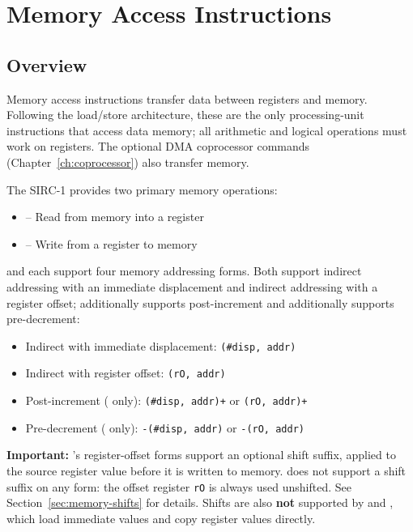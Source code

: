 \chapter{Memory Access Instructions}
\label{ch:memory-instructions}

\section{Overview}

Memory access instructions transfer data between registers and memory. Following the load/store architecture, these are
the only processing-unit instructions that access data memory; all arithmetic and logical operations must work on
registers. The optional DMA coprocessor commands (Chapter~\ref{ch:coprocessor}) also transfer memory.

The SIRC-1 provides two primary memory operations:
\begin{itemize}
	\item {} -- Read from memory into a register
	\item {} -- Write from a register to memory
\end{itemize}

 and  each support four memory addressing forms. Both support indirect addressing with
an immediate displacement and indirect addressing with a register offset;  additionally supports
post-increment and  additionally supports pre-decrement:
\begin{itemize}
	\item Indirect with immediate displacement: \texttt{(\#disp, addr)}
	\item Indirect with register offset: \texttt{(rO, addr)}
	\item Post-increment ( only): \texttt{(\#disp, addr)+} or \texttt{(rO, addr)+}
	\item Pre-decrement ( only): \texttt{-(\#disp, addr)} or \texttt{-(rO, addr)}
\end{itemize}

\textbf{Important:} 's register-offset forms support an optional shift suffix, applied to the source
register value before it is written to memory.  does not support a shift suffix on any form: the
offset register \texttt{rO} is always used unshifted. See Section~\ref{sec:memory-shifts} for details. Shifts are
also \textbf{not} supported by  and , which load immediate values and copy register values
directly.

